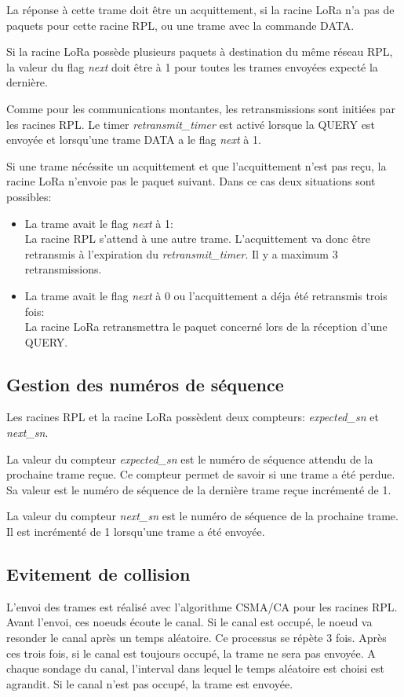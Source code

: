     La réponse à cette trame doit être un acquittement, si la racine LoRa n'a pas de paquets pour cette racine RPL, ou une trame avec la commande DATA.

    Si la racine LoRa possède plusieurs paquets à destination du même réseau RPL, la valeur du flag \textit{next} doit être à 1 pour toutes les trames envoyées expecté la dernière.

    Comme pour les communications montantes, les retransmissions sont initiées par les racines RPL.
    Le timer \textit{retransmit\_timer} est activé lorsque la QUERY est envoyée et lorsqu'une trame DATA a le flag \textit{next} à 1.

    Si une trame nécéssite un acquittement et que l'acquittement n'est pas reçu, la racine LoRa n'envoie pas le paquet suivant. Dans ce cas deux situations sont possibles:
    \begin{itemize}
        \item La trame avait le flag \textit{next} à 1:\\
            La racine RPL s'attend à une autre trame. L'acquittement va donc être retransmis à l'expiration du \textit{retransmit\_timer}. Il y a maximum 3 retransmissions.
        \item La trame avait le flag \textit{next} à 0 ou l'acquittement a déja été retransmis trois fois:\\
            La racine LoRa retransmettra le paquet concerné lors de la réception d'une QUERY.
    \end{itemize}

\subsection{Gestion des numéros de séquence}
    Les racines RPL et la racine LoRa possèdent deux compteurs: \textit{expected\_sn} et \textit{next\_sn}.

    La valeur du compteur \textit{expected\_sn} est le numéro de séquence attendu de la prochaine trame reçue. Ce compteur permet de savoir si une trame a été perdue. Sa valeur est le numéro de séquence de la dernière trame reçue incrémenté de 1.

    La valeur du compteur \textit{next\_sn} est le numéro de séquence de la prochaine trame. Il est incrémenté de 1 lorsqu'une trame a été envoyée.

\subsection{Evitement de collision}
    L'envoi des trames est réalisé avec l'algorithme CSMA/CA pour les racines RPL. 
    Avant l'envoi, ces noeuds écoute le canal. Si le canal est occupé, le noeud va resonder le canal après un temps aléatoire. Ce processus se répète 3 fois. Après ces trois fois, si le canal est toujours occupé, la trame ne sera pas envoyée. A chaque sondage du canal, l'interval dans lequel le temps aléatoire est choisi est agrandit. Si le canal n'est pas occupé, la trame est envoyée.
